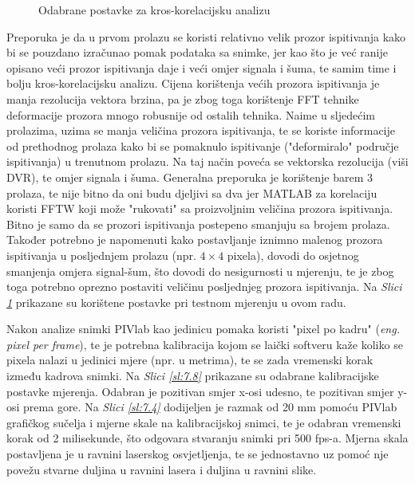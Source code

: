 \begin{description}[style=unboxed,leftmargin=0cm]
\begin{figure}[h]
		\caption{Odabrane postavke za kros-korelacijsku analizu}
		\label{sl:7.7}
	\end{figure}
	\par
	Preporuka je da u prvom prolazu se koristi relativno velik prozor ispitivanja kako bi se pouzdano izračunao pomak podataka sa snimke, jer kao što je već ranije opisano veći prozor ispitivanja daje i veći omjer signala i šuma, te samim time i bolju kros-korelacijsku analizu. Cijena korištenja većih prozora ispitivanja je manja rezolucija vektora brzina, pa je zbog toga korištenje FFT tehnike deformacije prozora mnogo robusnije od ostalih tehnika. Naime u sljedećim prolazima, uzima se manja veličina prozora ispitivanja, te se koriste informacije od prethodnog prolaza kako bi se pomaknulo ispitivanje ("deformiralo" područje ispitivanja) u trenutnom prolazu. Na taj način poveća se vektorska rezolucija (viši DVR), te omjer signala i šuma. Generalna preporuka je korištenje barem 3 prolaza, te nije bitno da oni budu djeljivi sa dva jer MATLAB za korelaciju koristi FFTW koji može "rukovati" sa proizvoljnim veličina prozora ispitivanja. Bitno je samo da se prozori ispitivanja postepeno smanjuju sa brojem prolaza. Također potrebno je napomenuti kako postavljanje iznimno malenog prozora ispitivanja u posljednjem prolazu (npr. $4\times4$ pixela), dovodi do osjetnog smanjenja omjera signal-šum, što dovodi do nesigurnosti u mjerenju, te je zbog toga potrebno oprezno postaviti veličinu posljednjeg prozora ispitivanja. Na \textit{Slici \ref{sl:7.7}} prikazane su korištene postavke pri testnom mjerenju u ovom radu.
	\item[Kalibracija] Nakon analize snimki PIVlab kao jedinicu pomaka koristi "pixel po kadru" (\textit{eng. pixel per frame}), te je potrebna kalibracija kojom se laički softveru kaže koliko se pixela nalazi u jedinici mjere (npr. u metrima), te se zada vremenski korak između kadrova snimki. Na \textit{Slici \ref{sl:7.8}} prikazane su odabrane kalibracijske postavke mjerenja. Odabran je pozitivan smjer x-osi udesno, te pozitivan smjer y-osi prema gore. Na \textit{Slici \ref{sl:7.4}} dodijeljen je razmak od 20 mm pomoću PIVlab grafičkog sučelja i mjerne skale na kalibracijskoj snimci, te je odabran vremenski korak od 2 milisekunde, što odgovara stvaranju snimki pri 500 fps-a. Mjerna skala postavljena je u ravnini laserskog osvjetljenja, te se jednostavno uz pomoć nje povežu stvarne duljina u ravnini lasera i duljina u ravnini slike.
	\begin{figure}[h]  
		\centering

\end{figure}
\end{description}
